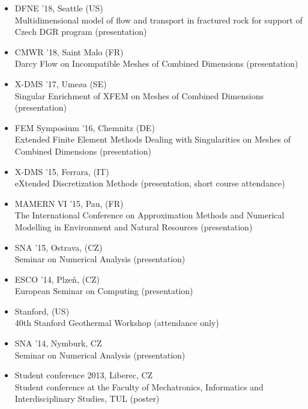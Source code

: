 \documentclass[bibliography=totocnumbered,dvipsnames,FM,Dis]{tulthesis_autoreferat}
\begin{document}
\begin{itemize}[label={}, leftmargin=*]
\item DFNE '18, Seattle (US) \\ Multidimensional model of flow and transport in fractured
rock for support of Czech DGR program (presentation)
\item CMWR '18, Saint Malo (FR) \\ Darcy Flow on Incompatible Meshes of
Combined Dimensions (presentation)
\item X-DMS '17, Ume{\o a} (SE) \\ Singular Enrichment of XFEM on Meshes of
Combined Dimensions (presentation)
\item FEM Symposium '16, Chemnitz (DE) \\ Extended Finite Element Methods Dealing with Singularities on Meshes of Combined Dimensions (presentation)
\item X-DMS '15, Ferrara, (IT) \\ eXtended Discretization Methods (presentation, short course attendance)
\item MAMERN VI '15, Pau, (FR) \\ The International Conference on Approximation Methods and Numerical Modelling in Environment and Natural Resources (presentation)
\item SNA '15, Ostrava, (CZ) \\ Seminar on Numerical Analysis (presentation)
\item ESCO '14, Plze{\v n}, (CZ) \\ European Seminar on Computing (presentation)
\item Stanford, (US) \\ 40th Stanford Geothermal Workshop (attendance only)
\item SNA '14, Nymburk, CZ \\ Seminar on Numerical Analysis (presentation)
\item Student conference 2013, Liberec, CZ \\ Student conference at the Faculty of Mechatronics, Informatics and Interdisciplinary Studies, TUL (poster)
\end{itemize}




\end{document}
